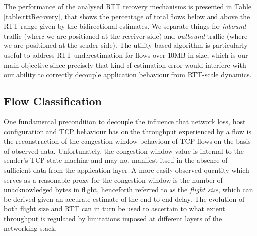 The performance of the analysed RTT recovery mechanisms is presented in Table \ref{table:rttRecovery}, that shows the percentage of total flows below and above the RTT range given by the bidirectional estimates.
We separate things for \emph{inbound} traffic (where we are positioned at the receiver side) and \emph{outbound} traffic (where we are positioned at the sender side). The utility-based algorithm is particularly useful to address RTT underestimation for flows over 10MB in size, which is our main objective since precisely that kind of estimation error would interfere with our ability to correctly decouple application behaviour from RTT-scale dynamics.




\subsection{Flow Classification}
\label{subsection:malawi:flightAggregation}

One fundamental precondition to decouple the influence that network loss, host configuration and TCP behaviour has on the throughput experienced by a flow is the reconstruction of the congestion window behaviour of TCP flows on the basis of observed data. 
Unfortunately, the congestion window value is internal to the sender's TCP state machine and may not manifest itself in the absence of sufficient data from the application layer. 
A more easily observed quantity which serves as a reasonable proxy for the congestion window is the number of unacknowledged bytes in flight, henceforth referred to as the \textit{flight size}, which can be derived given an accurate estimate of the end-to-end delay.
The evolution of both flight size and RTT can in turn be used to ascertain to what extent throughput is regulated by limitations imposed at different layers of the networking stack.

